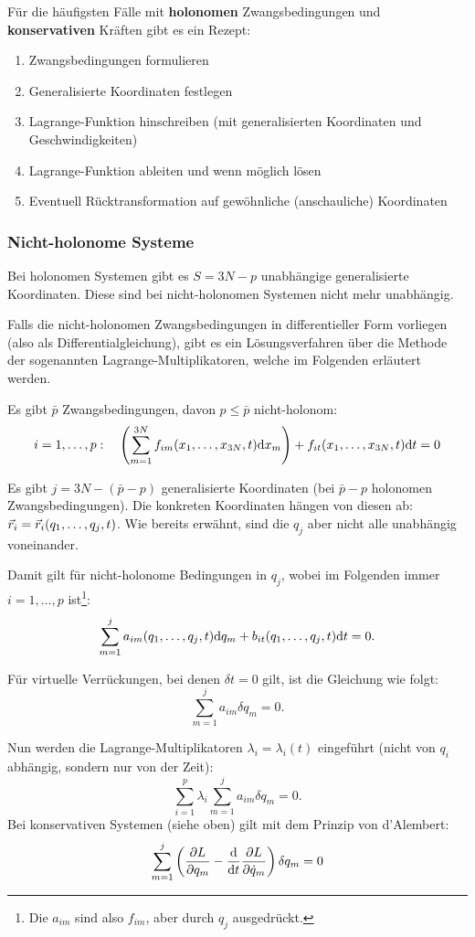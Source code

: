 Für die häufigsten Fälle mit \textbf{holonomen} Zwangsbedingungen und \textbf{konservativen} Kräften gibt es ein Rezept:
\begin{enumerate}
\item Zwangsbedingungen formulieren
\item Generalisierte Koordinaten festlegen
\item Lagrange-Funktion hinschreiben (mit generalisierten Koordinaten und Geschwindigkeiten)
\item Lagrange-Funktion ableiten und wenn möglich lösen
\item Eventuell Rücktransformation auf gewöhnliche (anschauliche) Koordinaten
\end{enumerate}

\subsubsection{Nicht-holonome Systeme}
Bei holonomen Systemen gibt es $S = 3N - p$ unabhängige generalisierte Koordinaten. Diese sind bei nicht-holonomen Systemen nicht mehr unabhängig.

Falls die nicht-holonomen Zwangsbedingungen in differentieller Form vorliegen (also als Differentialgleichung), gibt es ein Lösungsverfahren über die Methode der sogenannten Lagrange-Multiplikatoren, welche im Folgenden erläutert werden.

Es gibt $\bar{p}$ Zwangsbedingungen, davon $p \leq \bar{p}$ nicht-holonom: 
\[
	i = 1, \dots, p: 
	\quad 
	\left( \sum_{m=1}^{3N} f_{im}(x_1, \dots, x_{3N}, t) \mathrm d x_m \right) + f_{it}(x_1, \dots, x_{3N}, t) \mathrm d t = 0
\]

Es gibt $j = 3N - (\bar{p} - p)$ generalisierte Koordinaten (bei $\bar{p} - p$ holonomen Zwangsbedingungen). Die konkreten Koordinaten hängen von diesen ab: $\vec{r}_i = \vec{r}_i(q_1, \dots, q_j, t)$. Wie bereits erwähnt, sind die $q_j$ aber nicht alle unabhängig voneinander.

Damit gilt für nicht-holonome Bedingungen in $q_j$, wobei im Folgenden immer $i = 1, \dots, p$ ist\footnote{Die $a_{im}$ sind also $f_{im}$, aber durch $q_j$ ausgedrückt.}:
\[
	\sum_{m = 1}^j a_{im}(q_1, \dots, q_j, t) \mathrm d q_m + b_{it}(q_1, \dots, q_j, t) \mathrm d t = 0
	\text{.}
\]

Für virtuelle Verrückungen, bei denen $\delta t = 0$ gilt, ist die Gleichung wie folgt:
\[
	\sum_{m=1}^j a_{im} \delta q_m = 0
	\text{.}
\]

Nun werden die Lagrange-Multiplikatoren $\lambda_i = \lambda_i(t)$ eingeführt (nicht von $q_i$ abhängig, sondern nur von der Zeit):
\[
	\sum_{i=1}^{p} \lambda_i \sum_{m=1}^j a_{im} \delta q_m = 0
	\text{.}
\]
Bei konservativen Systemen (siehe oben) gilt mit dem Prinzip von d'Alembert:
\[
	\sum_{m=1}^j \left( \frac{\partial L}{\partial q_m} - \frac{\mathrm d}{\mathrm d t} \frac{\partial L}{\partial \dot{q}_m} \right) \delta q_m = 0
\]

